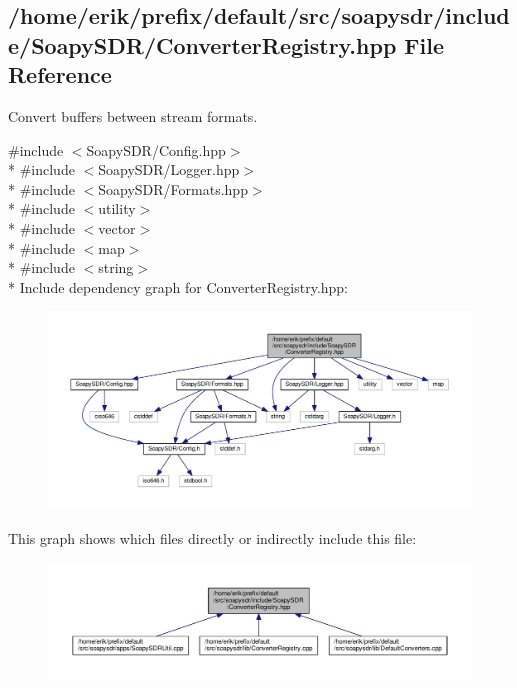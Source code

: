 \subsection{/home/erik/prefix/default/src/soapysdr/include/\+Soapy\+S\+D\+R/\+Converter\+Registry.hpp File Reference}
\label{ConverterRegistry_8hpp}


Convert buffers between stream formats.  


{\ttfamily \#include $<$Soapy\+S\+D\+R/\+Config.\+hpp$>$}\\*
{\ttfamily \#include $<$Soapy\+S\+D\+R/\+Logger.\+hpp$>$}\\*
{\ttfamily \#include $<$Soapy\+S\+D\+R/\+Formats.\+hpp$>$}\\*
{\ttfamily \#include $<$utility$>$}\\*
{\ttfamily \#include $<$vector$>$}\\*
{\ttfamily \#include $<$map$>$}\\*
{\ttfamily \#include $<$string$>$}\\*
Include dependency graph for Converter\+Registry.\+hpp\+:
\nopagebreak
\begin{figure}[H]
\begin{center}
\leavevmode
\includegraphics[width=350pt]{dc/d0a/ConverterRegistry_8hpp__incl}
\end{center}
\end{figure}
This graph shows which files directly or indirectly include this file\+:
\nopagebreak
\begin{figure}[H]
\begin{center}
\leavevmode
\includegraphics[width=350pt]{d9/d48/ConverterRegistry_8hpp__dep__incl}
\end{center}
\end{figure}
